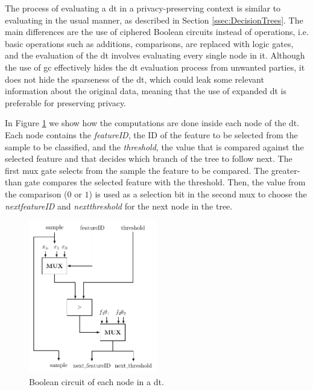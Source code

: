 The process of evaluating a \ac{dt} in a privacy-preserving context is similar to evaluating in the usual manner, as described in Section \ref{ssec:DecisionTrees}. The main differences are the use of ciphered Boolean circuits instead of operations, i.e. basic operations such as additions, comparisons, are replaced with logic gates, and the evaluation of the \ac{dt} involves evaluating every single node in it. Although the use of \ac{gc} effectively hides the \ac{dt} evaluation process from unwanted parties, it does not hide the sparseness of the \ac{dt}, which could leak some relevant information about the original data, meaning that the use of expanded \ac{dt} is preferable for preserving privacy.


In Figure \ref{fig:DTNode} we show how the computations are done inside each node of the \ac{dt}. Each node contains the \textit{featureID}, the ID of the feature to be selected from the sample to be classified, and the \textit{threshold}, the value that is compared against the selected feature and that decides which branch of the tree to follow next. The first \ac{mux} gate selects from the sample the feature to be compared. The greater-than gate compares the selected feature with the threshold. Then, the value from the comparison ($0$ or $1$) is used as a selection bit in the second \ac{mux} to choose the \textit{next\textunderscore featureID} and \textit{next\textunderscore threshold} for the next node in the tree. 
\begin{figure}[ht]
  \centering
  \includegraphics[width=0.50\textwidth]{images/decision_tree_node.pdf}
  \caption{Boolean circuit of each node in a \acs{dt}.}
  \label{fig:DTNode}
\end{figure}



